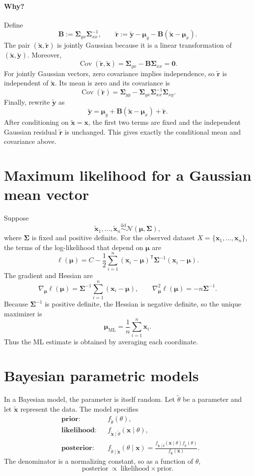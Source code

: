 \documentclass[11pt]{article}
\newcommand{\Cov}{\operatorname{Cov}}
\newcommand{\iid}{\mathrel{\overset{\mathrm{iid}}{\sim}}}
\newcommand{\ML}{\mathrm{ML}}
\newcommand{\rv}[1]{\widetilde{#1}}
\newcommand{\rvv}[1]{\widetilde{\bm{#1}}}
\begin{document}
\paragraph{Why?}
Define
\[
  \bm{B}:=\bm{\Sigma}_{yx}\bm{\Sigma}_{xx}^{-1},
  \qquad
  \rvv{r}:=\rvv{y}-\bm{\mu}_y
     -\bm{B}(\rvv{x}-\bm{\mu}_x).
\]
The pair $(\rvv{x},\rvv{r})$ is jointly Gaussian because it is a linear
transformation of $(\rvv{x},\rvv{y})$.  Moreover,
\[
  \Cov(\rvv{r},\rvv{x})
  =\bm{\Sigma}_{yx}-\bm{B}\bm{\Sigma}_{xx}=\bm{0}.
\]
For jointly Gaussian vectors, zero covariance implies independence, so
$\rvv{r}$ is independent of $\rvv{x}$.  Its mean is zero and its covariance is
\[
  \Cov(\rvv{r})
  =\bm{\Sigma}_{yy}
   -\bm{\Sigma}_{yx}\bm{\Sigma}_{xx}^{-1}\bm{\Sigma}_{xy}.
\]
Finally, rewrite $\rvv{y}$ as
\[
  \rvv{y}=\bm{\mu}_y+\bm{B}(\rvv{x}-\bm{\mu}_x)+\rvv{r}.
\]
After conditioning on $\rvv{x}=\bm{x}$, the first two terms are fixed and the
independent Gaussian residual $\rvv{r}$ is unchanged.  This gives exactly the
conditional mean and covariance above.

\section{Maximum likelihood for a Gaussian mean vector}

Suppose
\[
  \rvv{x}_1,\ldots,\rvv{x}_n
  \iid\mathcal N(\bm{\mu},\bm{\Sigma}),
\]
where $\bm{\Sigma}$ is fixed and positive definite.  For the observed dataset
$X=\{\bm{x}_1,\ldots,\bm{x}_n\}$, the terms of the log-likelihood that depend
on $\bm{\mu}$ are
\[
  \ell(\bm{\mu})
  =C-\frac12\sum_{i=1}^n
  (\bm{x}_i-\bm{\mu})^{\mathsf T}\bm{\Sigma}^{-1}
  (\bm{x}_i-\bm{\mu}).
\]
The gradient and Hessian are
\[
  \nabla_{\bm{\mu}}\ell(\bm{\mu})
  =\bm{\Sigma}^{-1}\sum_{i=1}^n(\bm{x}_i-\bm{\mu}),
  \qquad
  \nabla_{\bm{\mu}}^2\ell(\bm{\mu})=-n\bm{\Sigma}^{-1}.
\]
Because $\bm{\Sigma}^{-1}$ is positive definite, the Hessian is negative
definite, so the unique maximizer is
\[
  \boxed{\bm{\mu}_{\ML}=\frac1n\sum_{i=1}^n\bm{x}_i.}
\]
Thus the ML estimate is obtained by averaging each coordinate.


\section{Bayesian parametric models}

In a Bayesian model, the parameter is itself random.  Let $\rv{\theta}$ be a
parameter and let $\rvv{x}$ represent the data.  The model specifies
\begin{align*}
  &\textbf{prior:} && f_{\rv{\theta}}(\theta),\\
  &\textbf{likelihood:} && f_{\rvv{x}\mid\rv{\theta}}(\bm{x}\mid\theta),\\
  &\textbf{posterior:} &&
  f_{\rv{\theta}\mid\rvv{x}}(\theta\mid\bm{x})
  =\frac{f_{\rvv{x}\mid\rv{\theta}}(\bm{x}\mid\theta)
          f_{\rv{\theta}}(\theta)}
         {f_{\rvv{x}}(\bm{x})}.
\end{align*}
The denominator is a normalizing constant, so as a function of $\theta$,
\[
  \boxed{\text{posterior}\ \propto\ \text{likelihood}\times\text{prior}.}
\]
\end{document}
